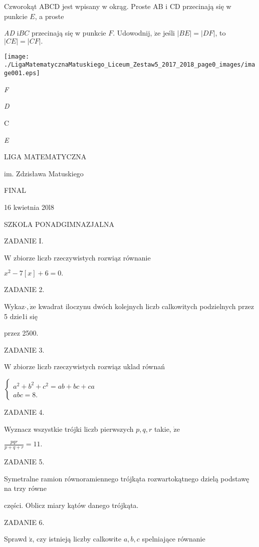 \documentclass[a4paper,12pt]{article}
\begin{document}
Czworokąt ABCD jest wpisany w okrąg. Proste AB $\mathrm{i}$ CD przecinają się w punkcie $E$, a proste

{\it AD} $\mathrm{i}BC$ przecinają się w punkcie $F$. Udowodnij, $\dot{\mathrm{z}}\mathrm{e}$ jeśli $|BE|=|DF|$, to $|CE|=|CF|.$
\begin{center}
\texttt{[image: ./LigaMatematycznaMatuskiego\_Liceum\_Zestaw5\_2017\_2018\_page0\_images/image001.eps]}
\end{center}
{\it F}

{\it D}

C

{\it E}






LIGA MATEMATYCZNA

im. Zdzisława Matuskiego

FINAL

16 kwietnia 20l8

SZKOLA PONADGIMNAZJALNA

ZADANIE I.

$\mathrm{W}$ zbiorze liczb rzeczywistych rozwiąz równanie

$x^{2}-7[x]+6=0.$

ZADANIE 2.

Wykaz$\cdot, \dot{\mathrm{z}}\mathrm{e}$ kwadrat iloczynu dwóch kolejnych liczb calkowitych podzielnych przez 5 dzie1i się

przez 2500.

ZADANIE 3.

$\mathrm{W}$ zbiorze liczb rzeczywistych rozwiąz uklad równań

$\left\{\begin{array}{l}
a^{2}+b^{2}+c^{2}=ab+bc+ca\\
abc=8.
\end{array}\right.$

ZADANIE 4.

Wyznacz wszystkie trójki liczb pierwszych $p, q, r$ takie, $\dot{\mathrm{z}}\mathrm{e}$

$\displaystyle \frac{pqr}{p+q+r}=11.$

ZADANIE 5.

Symetralne ramion równoramiennego trójkąta rozwartokątnego dzielą podstawę na trzy równe

części. Oblicz miary kątów danego trójkąta.

ZADANIE 6.

Sprawd $\acute{\mathrm{z}}$, czy istnieją liczby calkowite $a, b, c$ spelniające równanie
\end{document}
